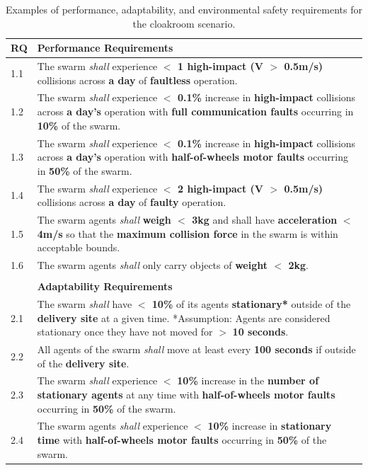 \documentclass{article}
\begin{document}
\begin{table}[!t]
\centering
\caption{\label{tab:reqs}Examples of performance, adaptability, and environmental safety requirements for the cloakroom scenario.}
\begin{tabular}{p{5mm} p{140mm} }
\textbf{RQ} & \textbf{Performance Requirements}\\
\hline
1.1 & The swarm \emph{shall} experience \textbf{$<$ 1 high-impact (V $>$ 0.5m/s)} collisions across \textbf{a day} of \textbf{faultless} operation. \\ 
\hline
1.2 & The swarm \emph{shall} experience \textbf{$<$ 0.1\%} increase in \textbf{high-impact} collisions across \textbf{a day's} operation with \textbf{full communication faults} occurring in \textbf{10\%} of the swarm.\\ 
\hline
1.3 & The swarm \emph{shall} experience \textbf{$<$ 0.1\%} increase in \textbf{high-impact} collisions across \textbf{a day's} operation with \textbf{half-of-wheels motor faults} occurring in \textbf{50\%} of the swarm.	\\	
\hline
1.4 & The swarm \emph{shall} experience \textbf{$<$ 2 high-impact (V $>$ 0.5m/s)} collisions across \textbf{a day} of \textbf{faulty} operation.  \\		 		
\hline
1.5 & The swarm agents \emph{shall} \textbf{weigh $<$ 3kg} and shall have \textbf{acceleration} \textbf{$<$ 4m/s} so that the \textbf{maximum collision force} in the swarm is within acceptable bounds. \\
\hline
1.6 & The swarm agents \emph{shall} only carry objects of \textbf{weight $<$ 2kg}. \\ 
\hline \\[-1.25\medskipamount]
& \textbf{Adaptability Requirements}\\
\hline
2.1 & The swarm \emph{shall} have \textbf{$<$ 10\%} of its agents \textbf{stationary*} outside of the \textbf{delivery site} at a given time.
*Assumption: Agents are considered stationary once they have not moved for $>$ \textbf{10 seconds}.
\\ 
\hline
2.2 & All agents of the swarm \emph{shall} move at least every \textbf{100 seconds} if outside of the \textbf{delivery site}.\\ 
\hline
2.3 & The swarm \emph{shall} experience $<$ \textbf{10\%} increase in the \textbf{number of stationary agents} at any time with \textbf{half-of-wheels motor faults} occurring in \textbf{50\%} of the swarm. \\
\hline
2.4 & The swarm agents \emph{shall} experience $<$ \textbf{10\%} increase in \textbf{stationary time} with \textbf{half-of-wheels motor faults} occurring in \textbf{50\%} of  the swarm.\\ 

\end{tabular}
\end{table}
\end{document}
